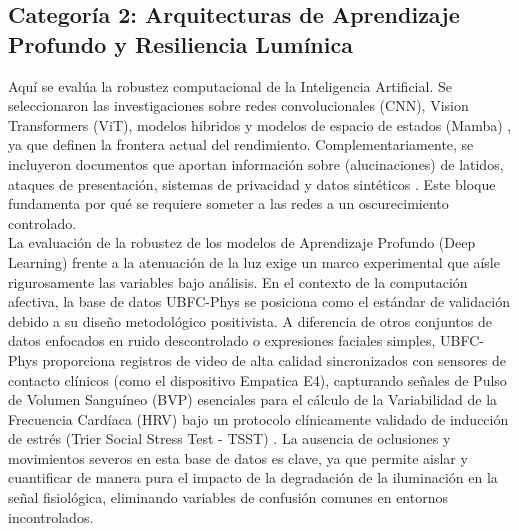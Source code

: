 \subsection{Categoría 2: Arquitecturas de Aprendizaje Profundo y Resiliencia Lumínica}
Aquí se evalúa la robustez computacional de la Inteligencia Artificial. Se seleccionaron las investigaciones sobre redes convolucionales (CNN), Vision 
Transformers (ViT), modelos hibridos y modelos de espacio de estados (Mamba) \cite{yu2023physformer, chang2025physvim, cen2025robust, yan2025physmamba}, ya que definen la 
frontera actual del rendimiento. Complementariamente, se incluyeron documentos que aportan información sobre (alucinaciones) de latidos, ataques de presentación, 
sistemas de privacidad y datos sintéticos \cite{wu2026udarppg, speth2023hallucinated, gupta2023privacy_pres, xu2023ivrrppg, qiao2022revise}. Este bloque 
fundamenta por qué se requiere someter a las redes a un oscurecimiento controlado.\\

La evaluación de la robustez de los modelos de Aprendizaje Profundo (Deep Learning) frente a la atenuación de la luz exige un marco experimental que aísle 
rigurosamente las variables bajo análisis. En el contexto de la computación afectiva, la base de datos UBFC-Phys
 se posiciona como el estándar de validación debido a su diseño metodológico positivista. A diferencia de otros conjuntos de datos enfocados en ruido 
 descontrolado o expresiones faciales simples, UBFC-Phys proporciona registros de video de alta calidad sincronizados con sensores de contacto clínicos 
 (como el dispositivo Empatica E4), capturando señales de Pulso de Volumen Sanguíneo (BVP) esenciales para el cálculo de la Variabilidad de la Frecuencia 
 Cardíaca (HRV) bajo un protocolo clínicamente validado de inducción de estrés (Trier Social Stress Test - TSST) \cite{debnath2026advanced_signal, cho2025dualbranch}. La ausencia de oclusiones y movimientos 
 severos en esta base de datos es clave, ya que permite aislar y cuantificar de manera pura el impacto de la 
degradación de la iluminación en la señal fisiológica, eliminando variables de confusión comunes en entornos incontrolados.\\

